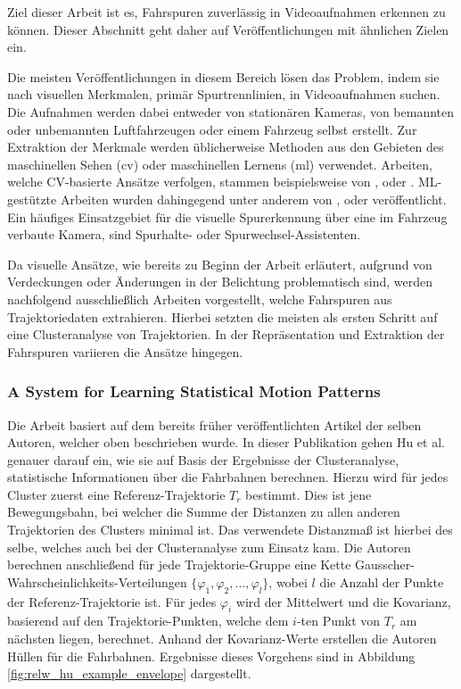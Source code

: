 Ziel dieser Arbeit ist es, Fahrspuren zuverlässig in Videoaufnahmen erkennen zu können. Dieser Abschnitt
geht daher auf Veröffentlichungen mit ähnlichen Zielen ein.

Die meisten Veröffentlichungen in diesem Bereich lösen das Problem, indem sie nach visuellen Merkmalen,
primär Spurtrennlinien, in Videoaufnahmen suchen. Die Aufnahmen werden dabei entweder von stationären Kameras,
von bemannten oder unbemannten Luftfahrzeugen oder einem Fahrzeug selbst erstellt. Zur Extraktion der Merkmale werden
üblicherweise Methoden aus den Gebieten des maschinellen Sehen (\acrshort*{cv}) oder maschinellen Lernens (\acrshort*{ml}) verwendet.
Arbeiten, welche CV-basierte Ansätze verfolgen, stammen beispielsweise von \cite[]{Lai2000}, \cite[]{McCall2006} oder \cite[]{Aly2008}.
ML-gestützte Arbeiten wurden dahingegend unter anderem von \cite[]{Kim2008}, \cite[]{Gopalan2012} oder
\cite[]{Neven2018} veröffentlicht.
Ein häufiges Einsatzgebiet für die visuelle Spurerkennung über eine im Fahrzeug verbaute Kamera, sind Spurhalte- oder
Spurwechsel-Assistenten.

Da visuelle Ansätze, wie bereits zu Beginn der Arbeit erläutert, aufgrund von Verdeckungen oder Änderungen
in der Belichtung problematisch sind, werden nachfolgend ausschließlich Arbeiten vorgestellt, welche Fahrspuren
aus Trajektoriedaten extrahieren. Hierbei setzten die meisten als ersten Schritt auf eine Clusteranalyse von Trajektorien.
In der Repräsentation und Extraktion der Fahrspuren variieren die Ansätze hingegen.

\subsubsection*{A System for Learning Statistical Motion Patterns}
Die Arbeit \cite[]{WeimingHu2006} basiert auf dem bereits früher veröffentlichten Artikel \cite[]{Hu2005} der selben Autoren,
welcher oben beschrieben wurde. In dieser Publikation gehen Hu et al. genauer darauf ein, wie sie auf Basis
der Ergebnisse der Clusteranalyse, statistische Informationen über die Fahrbahnen berechnen.
Hierzu wird für jedes Cluster zuerst eine Referenz-Trajektorie $T_r$ bestimmt. Dies ist jene Bewegungsbahn,
bei welcher die Summe der Distanzen zu allen anderen Trajektorien des Clusters minimal ist. Das verwendete
Distanzmaß ist hierbei des selbe, welches auch bei der Clusteranalyse zum Einsatz kam.
Die Autoren berechnen anschließend für jede Trajektorie-Gruppe eine Kette Gausscher-Wahrscheinlichkeits-Verteilungen
$\{ \varphi_1, \varphi_2, ..., \varphi_l \}$, wobei $l$ die Anzahl der Punkte der Referenz-Trajektorie ist.
Für jedes $\varphi_i$ wird der Mittelwert und die Kovarianz, basierend auf den Trajektorie-Punkten, welche dem
$i$-ten Punkt von $T_r$ am nächsten liegen, berechnet.
Anhand der Kovarianz-Werte erstellen die Autoren Hüllen für die Fahrbahnen. Ergebnisse dieses Vorgehens sind in
Abbildung \ref{fig:relw_hu_example_envelope} dargestellt.

